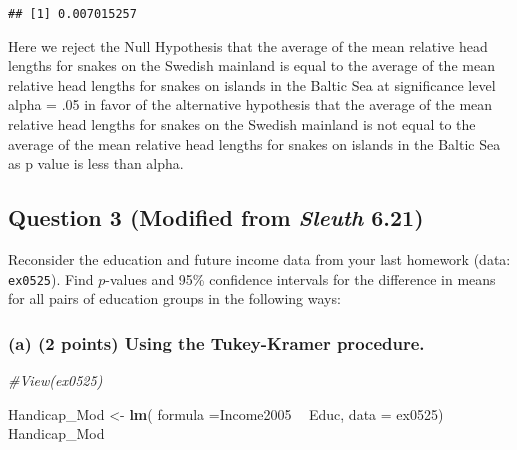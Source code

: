 \documentclass[]{article}
\newenvironment{Shaded}{\begin{snugshade}}{\end{snugshade}}
\newcommand{\KeywordTok}[1]{\textcolor[rgb]{0.13,0.29,0.53}{\textbf{#1}}}
\newcommand{\DataTypeTok}[1]{\textcolor[rgb]{0.13,0.29,0.53}{#1}}
\newcommand{\DecValTok}[1]{\textcolor[rgb]{0.00,0.00,0.81}{#1}}
\newcommand{\StringTok}[1]{\textcolor[rgb]{0.31,0.60,0.02}{#1}}
\newcommand{\CommentTok}[1]{\textcolor[rgb]{0.56,0.35,0.01}{\textit{#1}}}
\newcommand{\OperatorTok}[1]{\textcolor[rgb]{0.81,0.36,0.00}{\textbf{#1}}}
\newcommand{\NormalTok}[1]{#1}
\begin{document}
\begin{Shaded}
\end{Shaded}

\begin{verbatim}
## [1] 0.007015257
\end{verbatim}

Here we reject the Null Hypothesis that the average of the mean relative
head lengths for snakes on the Swedish mainland is equal to the average
of the mean relative head lengths for snakes on islands in the Baltic
Sea at significance level alpha = .05 in favor of the alternative
hypothesis that the average of the mean relative head lengths for snakes
on the Swedish mainland is not equal to the average of the mean relative
head lengths for snakes on islands in the Baltic Sea as p value is less
than alpha.

\subsection{\texorpdfstring{Question 3 (Modified from \emph{Sleuth}
6.21)}{Question 3 (Modified from Sleuth 6.21)}}\label{question-3-modified-from-sleuth-6.21}

Reconsider the education and future income data from your last homework
(data: \texttt{ex0525}). Find \(p\)-values and 95\% confidence intervals
for the difference in means for all pairs of education groups in the
following ways:

\subsubsection{(a) (2 points) Using the Tukey-Kramer
procedure.}\label{a-2-points-using-the-tukey-kramer-procedure.}

\begin{Shaded}
\begin{Highlighting}[]
\CommentTok{#View(ex0525)}

\NormalTok{Handicap_Mod <-}\StringTok{ }\KeywordTok{lm}\NormalTok{( }\DataTypeTok{formula =}\NormalTok{Income2005 }\OperatorTok{~}\StringTok{ }\NormalTok{Educ, }\DataTypeTok{data =}\NormalTok{ ex0525)}
\NormalTok{Handicap_Mod}
\end{Highlighting}
\end{Shaded}
\end{document}
